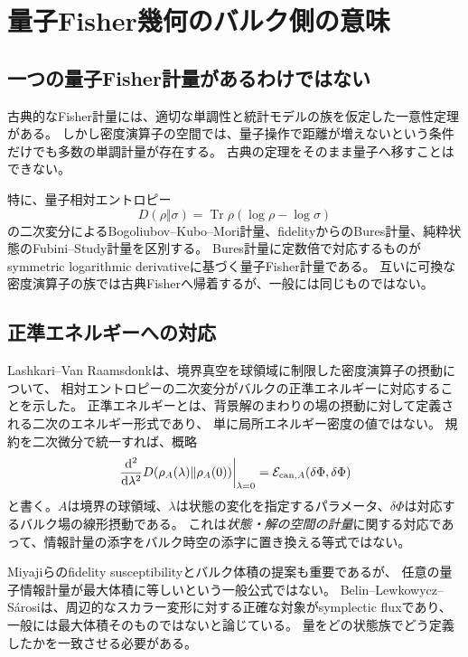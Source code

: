 \documentclass[a4paper,11pt]{ltjsarticle}
\numberwithin{equation}{section}
\newcommand{\dd}{\mathrm d}
\newcommand{\Tr}{\operatorname{Tr}}
\begin{document}
\section{量子Fisher幾何のバルク側の意味}
\subsection{一つの量子Fisher計量があるわけではない}
古典的なFisher計量には、適切な単調性と統計モデルの族を仮定した一意性定理がある。
しかし密度演算子の空間では、量子操作で距離が増えないという条件だけでも多数の単調計量が存在する\cite{Petz}。
古典の定理をそのまま量子へ移すことはできない。

特に、量子相対エントロピー
\begin{equation}
 D(\rho\Vert\sigma)=\Tr\rho(\log\rho-\log\sigma)
 \label{eq:relativeentropy}
\end{equation}
の二次変分によるBogoliubov--Kubo--Mori計量、fidelityからのBures計量、純粋状態のFubini--Study計量を区別する。
Bures計量に定数倍で対応するものがsymmetric logarithmic derivativeに基づく量子Fisher計量である。
互いに可換な密度演算子の族では古典Fisherへ帰着するが、一般には同じものではない。

\subsection{正準エネルギーへの対応}
Lashkari--Van Raamsdonkは、境界真空を球領域に制限した密度演算子の摂動について、
相対エントロピーの二次変分がバルクの正準エネルギーに対応することを示した\cite{LVR}。
正準エネルギーとは、背景解のまわりの場の摂動に対して定義される二次のエネルギー形式であり、
単に局所エネルギー密度の値ではない。
規約を二次微分で統一すれば、概略
\begin{equation}
 \left.\frac{\dd^2}{\dd\lambda^2}
 D(\rho_A(\lambda)\Vert\rho_A(0))\right|_{\lambda=0}
 =\mathcal E_{{\rm can},A}(\delta\Phi,\delta\Phi)
 \label{eq:canonical}
\end{equation}
と書く。$A$は境界の球領域、$\lambda$は状態の変化を指定するパラメータ、$\delta\Phi$は対応するバルク場の線形摂動である。
これは\emph{状態・解の空間の計量}に関する対応であって、情報計量の添字をバルク時空の添字に置き換える等式ではない。

Miyajiらのfidelity susceptibilityとバルク体積の提案も重要であるが\cite{Miyaji}、
任意の量子情報計量が最大体積に等しいという一般公式ではない。
Belin--Lewkowycz--S\'arosiは、周辺的なスカラー変形に対する正確な対象がsymplectic fluxであり、
一般には最大体積そのものではないと論じている\cite{York}。
量をどの状態族でどう定義したかを一致させる必要がある。
\end{document}
